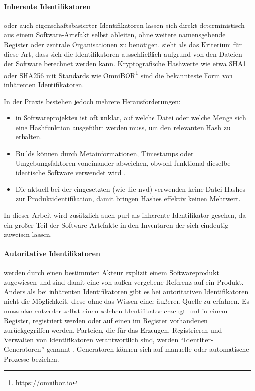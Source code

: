 \paragraph{Inherente Identifikatoren} %
oder auch eigenschaftsbasierter Identifikatoren lassen sich direkt deterministisch aus einem Software-Artefakt selbst ableiten, ohne weitere namensgebende Register oder zentrale Organisationen zu benötigen.
\citeauthor{CISA2023} sieht als das Kriterium für diese Art, dass sich die Identifikatoren ausschließlich aufgrund von den Dateien der Software berechnet werden kann.
Kryptografische Hashwerte wie etwa SHA1 oder SHA256 mit Standards wie OmniBOR\footnote{\url{https://omnibor.io}} sind die bekannteste Form von inhärenten Identifikatoren.

In der Praxis bestehen jedoch mehrere Herausforderungen:
\begin{itemize}
    \item in Softwareprojekten ist oft unklar, auf welche Datei oder welche Menge sich eine Hashfunktion ausgeführt werden muss, um den relevanten Hash zu erhalten.

    \item Builds können durch Metainformationen, Timestamps oder Umgebungsfaktoren voneinander abweichen, obwohl funktional dieselbe identische Software verwendet wird \autocite{CISA2023}.

    \item Die aktuell bei der \metaeffektsp eingesetzten  (wie die \acrshort{nvd}) verwenden keine Datei-Hashes zur Produktidentifikation, damit bringen Hashes effektiv keinen Mehrwert.
\end{itemize}

In dieser Arbeit wird zusätzlich auch \acrshort{purl} als inherente Identifikator gesehen, da ein großer Teil der Software-Artefakte in den Inventaren der \metaeffektsp sich eindeutig  zuweisen lassen.

\paragraph{Autoritative Identifikatoren}\label{par:authorative-identifiers} %
werden durch einen bestimmten Akteur explizit einem Softwareprodukt zugewiesen und sind damit eine von außen vergebene Referenz auf ein Produkt.
Anders als bei inhärenten Identifikatoren gibt es bei autoritativen Identifikatoren nicht die Möglichkeit, diese ohne das Wissen einer äußeren Quelle zu erfahren.
Es muss also entweder selbst einen solchen Identifikator erzeugt und in einem Register, registriert werden oder auf einen im Register vorhandenen zurückgegriffen werden.
Parteien, die für das Erzeugen, Registrieren und Verwalten von Identifikatoren verantwortlich sind, werden \enquote{Identifier-Generatoren} genannt \autocite{CISA2023}.
Generatoren können sich auf manuelle oder automatische Prozesse beziehen.

